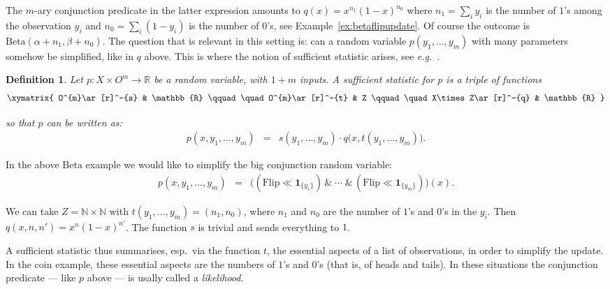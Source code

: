 \documentclass{mscs}
\newcommand{\NNO}{\mathbb{N}}
\newcommand{\R}{\mathbb{R}}
\newcommand{\andthen}{\ensuremath{\mathrel{\&}}}
\newcommand{\indic}[1]{\mathbf{1}_{#1}}
\newcommand{\betachan}{\ensuremath{\mathrm{Beta}}}
\newcommand{\flipchan}{\ensuremath{\mathrm{Flip}}}
\newtheorem{definition}[theorem]{Definition}
\begin{document}
\noindent The $m$-ary conjunction predicate in the latter expression
amounts to $q(x) = x^{n_1}(1-x)^{n_0}$ where $n_{1} = \sum_{i} y_{i}$
is the number of $1$'s among the observation $y_i$ and $n_{0} =
\sum_{i} (1-y_{i})$ is the number of $0$'s, see
Example~\ref{ex:betaflipupdate}. Of course the outcome is
$\betachan(\alpha+n_{1}, \beta+n_{0})$. The question that is relevant
in this setting is: can a random variable $p(y_{1}, \ldots, y_{m})$
with many parameters somehow be simplified, like in $q$ above. This is
where the notion of sufficient statistic arises, see
\textit{e.g.}~\cite{Koopman36,Bishop06}.


\begin{definition}
\label{def:sufstat}
Let $p\colon X\times O^{m} \rightarrow \R$ be a random variable, with
$1+m$ inputs. A \emph{sufficient statistic} for $p$ is a triple of
functions
\[ \xymatrix{
O^{m}\ar[r]^-{s} & \R
\qquad\quad
O^{m}\ar[r]^-{t} & Z
\qquad\quad
X\times Z\ar[r]^-{q} & \R
} \]

\noindent so that $p$ can be written as:
\begin{equation}
\label{eqn:sufstat}
\begin{array}{rcl}
p(x, y_{1}, \ldots, y_{m})
& = &
s(y_{1}, \ldots, y_{m}) \cdot q\big(x, t(y_{1}, \ldots, y_{m})\big).
\end{array}
\end{equation}
\end{definition}

In the above $\betachan$ example we would like to simplify the big
conjunction random variable:
\[ \begin{array}{rcl}
p(x, y_{1}, \ldots, y_{m})
& = &
\Big((\flipchan \ll \indic{\{y_1\}}) \,\andthen\; \cdots \;\andthen\,
  (\flipchan \ll \indic{\{y_m\}})\Big)(x).
\end{array} \]

\noindent We can take $Z = \NNO\times\NNO$ with $t(y_{1}, \ldots,
y_{m}) = (n_{1}, n_{0})$, where $n_1$ and $n_{0}$ are the number of
$1$'s and $0$'s in the $y_i$. Then $q(x, n, n') = x^{n}(1-x)^{n'}$.
The function $s$ is trivial and sends everything to $1$.

A sufficient statistic thus summarises, esp.\ via the function $t$,
the essential aspects of a list of observations, in order to simplify
the update. In the coin example, these essential aspects are the
numbers of $1$'s and $0$'s (that is, of heads and tails).  In these
situations the conjunction predicate --- like $p$ above --- is usally
called a \emph{likelihood}.
\end{document}

